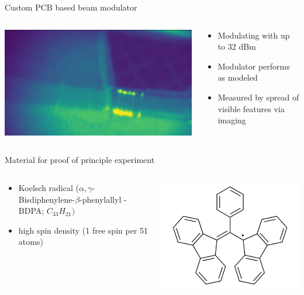 \documentclass[final]{beamer}
\begin{document}
\begin{frame}[fragile]{}
\begin{columns}[T]
\begin{column}{.49\linewidth}
\begin{block}{\Large Custom PCB based beam modulator}
\begin{columns}
\begin{column}{0.45\columnwidth}
				\includegraphics[width=0.49\columnwidth]{./figures/kickertest02.png}
			\end{column}
			\begin{column}{0.45\columnwidth}
				\begin{itemize}
					\item Modulating with up to 32 dBm 
					\item Modulator performs as modeled
					\item Measured by spread of visible features via imaging
				\end{itemize}
			\end{column}
		\end{columns}
	\end{block}

	\begin{block}{\Large Material for proof of principle experiment}
		\begin{columns}
			\begin{column}{0.60\columnwidth}
				\begin{itemize}
					\item Koelsch radical ($\alpha,\gamma$-Bisdiphenylene-$\beta$-phenylallyl - BDPA; $C_{33}H_{21})$
					\item high spin density (1 free spin per 51 atoms)
				\end{itemize}
			\end{column}
			\begin{column}{0.30\columnwidth}
				\includegraphics[width=\columnwidth]{./figures/bdpa.png}	
			\end{column}
		\end{columns}
	\end{block}



\end{column}
\end{columns}
\end{frame}
\end{document}
